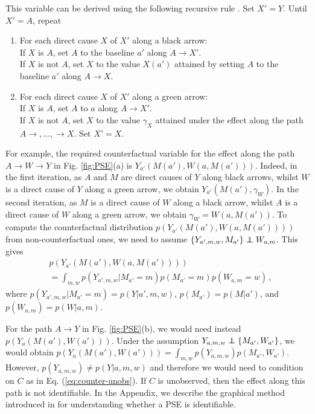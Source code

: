 \documentclass{article}
\newcommand{\figref}[1]{Fig. \ref{#1}}
\renewcommand{\eqref}[1]{Eq. (\ref{#1})}
\newcommand\independent{\protect\mathpalette{\protect\independenT}{\perp}}
\def\independenT#1#2{\mathrel{\rlap{$#1#2$}\mkern2mu{#1#2}}}
\newcommand\ci{\independent}
\begin{document}
This variable can be derived using the following recursive rule \cite{shpitser13counterfactual}.
Set $X'=Y$. Until $X'=A$, repeat
\begin{enumerate}[leftmargin=*]
\item For each direct cause $X$ of $X'$ along a black arrow:\\
If $X$ is $A$, set $A$ to the baseline $a'$ along $A\rightarrow X'$.\\
If $X$ is not $A$, set $X$ to the value $X(a')$ attained by setting $A$ to the baseline $a'$ along $A\rightarrow X$.\\ [-15pt]
\item For each direct cause $X$ of $X'$ along a green arrow:\\ 
If $X$ is $A$, set $A$ to $a$ along $A\rightarrow X'$.\\
If $X$ is not $A$, set $X$ to the value $\gamma_X$ attained under the effect along the path $A\rightarrow,\ldots, \rightarrow X$. Set $X'=X$.\\ [-15pt]
\end{enumerate}
For example, the required counterfactual variable for the effect along the path $A \rightarrow W \rightarrow Y$ in \figref{fig:PSE}(a) is $Y_{a'}(M(a'),W(a,M(a')))$. 
Indeed, in the first iteration, as $A$ and $M$ are direct causes of $Y$ along black arrows, whilst $W$ is a direct cause of $Y$ along a green arrow,  we obtain $Y_{a'}(M(a'),\gamma_W)$. 
In the second iteration, as $M$ is a direct cause of $W$ along a black arrow, whilst $A$ is a direct cause of $W$ along a green arrow, we obtain $\gamma_W=W(a,M(a'))$.
To compute the counterfactual distribution $p(Y_{a'}(M(a'),W(a,M(a'))))$ from non-counterfactual ones, 
we need to assume $\{Y_{a',m,w},M_{a'} \}\ci W_{a,m}$. This gives
\begin{align*}
&p(Y_{a'}(M(a'),W(a,M(a'))))\\
&=\int_{m,w}p(Y_{a',m,w}|M_{a'}=m)p(M_{a'}=m)p(W_{a,m}=w)\,,
\end{align*}
where $p(Y_{a',m,w}|M_{a'}=m)=p(Y|a',m,w)$, $p(M_{a'})=p(M|a')$, and $p(W_{a,m})=p(W|a,m)$.

For the path $A\rightarrow Y$ in \figref{fig:PSE}(b), we would need instead $p(Y_{a}(M(a'),W(a')))$. 
Under the assumption $Y_{a,m,w} \ci \{M_{a'}, W_{a'} \}$, we would obtain $p(Y_{a}(M(a'),W(a')))=\int_{m,w}p(Y_{a,m,w})p(M_{a'},W_{a'})$.
However, $p(Y_{a,m,w})\neq p(Y|a,m,w)$ and therefore we would need to condition on $C$ as in \eqref{eq:counter-unobs}. 
If $C$ is unobserved, then the effect along this path is not identifiable. In the Appendix, we describe the graphical method introduced in \citet{shpitser13counterfactual} for understanding whether a PSE is identifiable.
\end{document}
